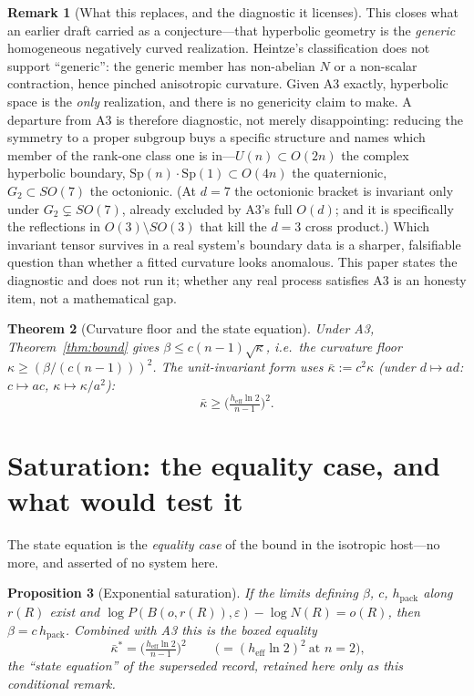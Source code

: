 \documentclass[11pt,reqno]{amsart}
\theoremstyle{plain}
\newtheorem{theorem}{Theorem}[section]
\newtheorem{proposition}[theorem]{Proposition}
\theoremstyle{definition}
\newtheorem{remark}[theorem]{Remark}
\newcommand{\hpack}{h_{\mathrm{pack}}}
\newcommand{\heff}{h_{\mathrm{eff}}}
\newcommand{\eps}{\varepsilon}
\begin{document}
\begin{remark}[What this replaces, and the diagnostic it licenses]\label{rem:diagnostic}
This closes what an earlier draft carried as a conjecture---that hyperbolic geometry is the \emph{generic} homogeneous negatively curved realization. Heintze's classification does not support ``generic'': the generic member has non-abelian $N$ or a non-scalar contraction, hence pinched anisotropic curvature. Given A3 exactly, hyperbolic space is the \emph{only} realization, and there is no genericity claim to make. A departure from A3 is therefore diagnostic, not merely disappointing: reducing the symmetry to a proper subgroup buys a specific structure and names which member of the rank-one class one is in---$U(n)\subset O(2n)$ the complex hyperbolic boundary, $\mathrm{Sp}(n)\!\cdot\!\mathrm{Sp}(1)\subset O(4n)$ the quaternionic, $G_2\subset SO(7)$ the octonionic. (At $d=7$ the octonionic bracket is invariant only under $G_2\subsetneq SO(7)$, already excluded by A3's full $O(d)$; and it is specifically the reflections in $O(3)\setminus SO(3)$ that kill the $d=3$ cross product.) Which invariant tensor survives in a real system's boundary data is a sharper, falsifiable question than whether a fitted curvature looks anomalous. This paper states the diagnostic and does not run it; whether any real process satisfies A3 is an honesty item, not a mathematical gap.
\end{remark}

\begin{theorem}[Curvature floor and the state equation]\label{thm:floor}
Under A3, Theorem~\ref{thm:bound} gives $\beta\le c(n-1)\sqrt\kappa$, i.e.\ the curvature floor $\kappa\ge(\beta/(c(n-1)))^2$. The unit-invariant form uses $\bar\kappa:=c^2\kappa$ (under $d\mapsto ad$: $c\mapsto ac$, $\kappa\mapsto\kappa/a^2$):
\[
\bar\kappa\ge\Big(\tfrac{\heff\ln2}{n-1}\Big)^2.
\]
\end{theorem}

\section{Saturation: the equality case, and what would test it}\label{sec:IIb}

The state equation is the \emph{equality case} of the bound in the isotropic host---no more, and asserted of no system here.

\begin{proposition}[Exponential saturation]\label{prop:sat}
If the limits defining $\beta$, $c$, $\hpack$ along $r(R)$ exist and $\log P(B(o,r(R)),\eps)-\log N(R)=o(R)$, then $\beta=c\,\hpack$. Combined with A3 this is the boxed equality
\[
\boxed{\ \bar\kappa^*=\Big(\tfrac{\heff\ln2}{n-1}\Big)^2\ }\qquad\Big(=(\heff\ln2)^2\ \text{at }n=2\Big),
\]
the ``state equation'' of the superseded record, retained here only as this conditional remark.
\end{proposition}
\end{document}

